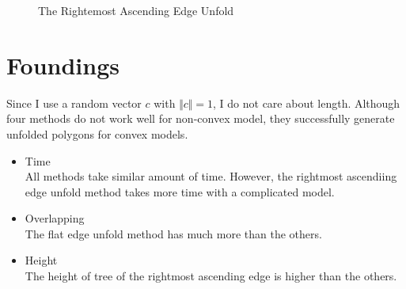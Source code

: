 \documentclass[11pt, letterpaper]{article}
\begin{document}
\begin{figure}[h]
\centering
{}
\hspace{5mm}
\hspace{5mm}
\hspace{5mm}
\hspace{5mm}
\caption{The Rightemost Ascending Edge Unfold}
\end{figure}




\clearpage
\section{Foundings}
Since I use a random vector $c$ with $\Vert c \Vert = 1$, I do not care about length. Although four methods do not work well for non-convex model, they successfully generate unfolded polygons for convex models. 
\begin{itemize}
	\item{Time}
	\\All methods take similar amount of time. However, the rightmost ascendiing edge unfold method takes more time with a complicated model.
	\item{Overlapping}
	\\The flat edge unfold method has much more than the others.
	\item{Height}
	\\The height of tree of the rightmost ascending edge is higher than the others.
\end{itemize}
\end{document}
